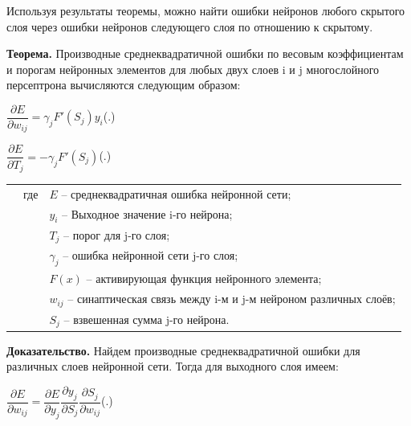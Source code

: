 {	\par \redline Используя результаты теоремы, можно найти ошибки нейронов любого скрытого слоя через ошибки нейронов следующего слоя по отношению к скрытому. 
%	

    \par \redline \textbf{Теорема.} Производные среднеквадратичной ошибки по весовым коэффициентам и порогам нейронных элементов для любых двух слоев i и j многослойного персептрона вычисляются следующим образом:
	
	\formulaspace \par \redline 
	$ \dfrac{\partial E}{\partial w_{ij}} = \gamma_{j} F'(S_{j}) y_{i}$\hfill (\thechaptercntr .\theformulacntr) \redline
	\formulaspace \addtocounter{formulacntr}{1}
	
	\formulaspace \par \redline 
	$\dfrac{\partial E}{\partial T_{j}} = - \gamma_{j} F'(S_{j})$\hfill (\thechaptercntr .\theformulacntr) \redline
	\formulaspace \addtocounter{formulacntr}{1}
	
	\begin{tabular}{p{}p{}p{}}
		& где  & $E$ {--} среднеквадратичная ошибка нейронной сети; \\
		&      & $y_{i}$ {--} Выходное значение i-го нейрона; \\
		&      & $T_{j}$ {--} порог для j-го слоя; \\
		&      & $\gamma_{j}$ {--} ошибка нейронной сети j-го слоя; \\
		&      & $F(x)$ {--} активирующая функция нейронного элемента; \\
		&      & $w_{ij}$ {--} синаптическая связь между i-м и j-м нейроном различных слоёв; \\
		&      & $S_{j}$ {--} взвешенная сумма j-го нейрона. \\
	\end{tabular}
	
	\par \redline \textbf{Доказательство.} Найдем производные среднеквадратичной ошибки для различных слоев нейронной сети. Тогда для выходного слоя имеем:
	
	\formulaspace \par \redline 
	$\dfrac{\partial E}{\partial w_{ij}} = \dfrac{\partial E}{\partial y_j} \dfrac{\partial y_j}{\partial S_j} \dfrac{\partial S_j}{\partial w_{ij}}$\hfill (\thechaptercntr .\theformulacntr) \redline
	\formulaspace \addtocounter{formulacntr}{1}
	
}
